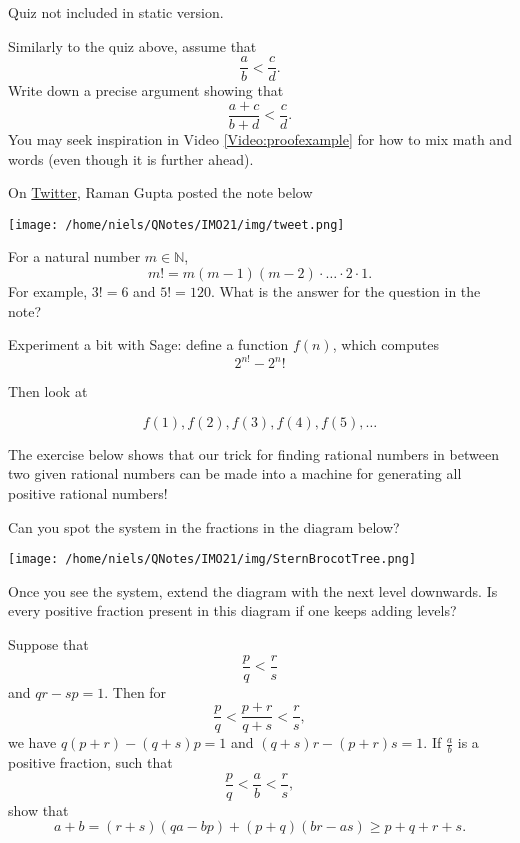 \begin{quizexercise} Quiz not included in static version.\end{quizexercise}

\begin{exercise}
  Similarly to the quiz above, assume that
  $$
    \frac{a}{b} < \frac{c}{d}.
  $$
  Write down a precise argument showing that
  $$
    \frac{a + c}{b + d} < \frac{c}{d}.
  $$
  You may seek inspiration in Video \ref{Video:proofexample} for
  how to mix math and words (even though
  it is further ahead).
\end{exercise}

\begin{exercise}
  On \href{https://twitter.com/Ramangupta4/status/1162999733142482945}{Twitter}, Raman Gupta posted the note below

  \begin{center}\texttt{[image: /home/niels/QNotes/IMO21/img/tweet.png]}\end{center}

  For a natural number $m\in \mathbb{N}$,
  $$
    m! = m (m-1) (m-2)\cdot \dots \cdot 2\cdot 1.
  $$
  For example, $3! = 6$ and $5! = 120$. What is the answer for the
  question in the note?

  \begin{hint}

    Experiment a bit with Sage: define a function $f(n)$, which computes
    $$
      2^{n!} - 2^n!
    $$

    Then look at

    $$
      f(1), f(2), f(3), f(4), f(5), \dots
    $$

  \end{hint}
\end{exercise}

The exercise below shows that our trick for finding rational numbers
in between two given rational numbers can be made into a machine for
generating all positive rational numbers!

\begin{exercise}
  Can you spot the system in the fractions in the diagram below?
  \begin{center}\texttt{[image: /home/niels/QNotes/IMO21/img/SternBrocotTree.png]}\end{center}
  Once you see the system, extend the diagram with the next level downwards. Is every
  positive fraction present in this diagram if one keeps adding levels?

  \begin{hint}
    Suppose that
    $$
      \frac{p}{q} < \frac{r}{s}
    $$
    and $q r - s p = 1$. Then for
    $$
      \frac{p}{q} <  \frac{p+r}{q+s} < \frac{r}{s},
    $$
    we have $q (p+r) - (q+s) p = 1$ and $(q+s) r - (p + r) s = 1$. If $\frac{a}{b}$ is
    a positive fraction, such that
    $$
      \frac{p}{q} <  \frac{a}{b} < \frac{r}{s},
    $$
    show that
    $$
      a + b = (r+s)(q a - b p)+(p+q)(b r - a s)\geq p+q+r+s.
    $$
  \end{hint}
\end{exercise}

